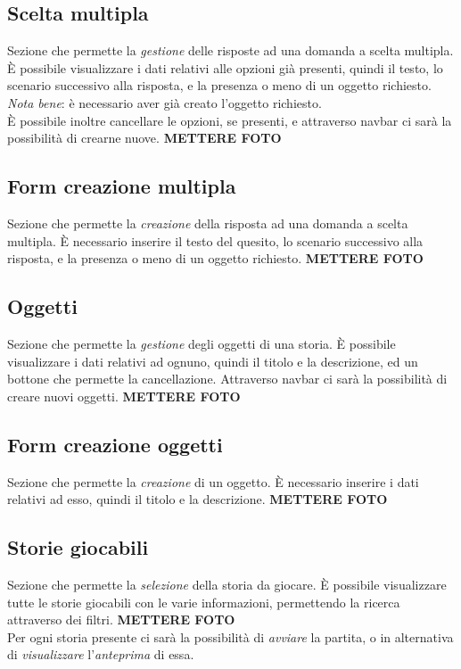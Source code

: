 \documentclass{article}
\begin{document}
\subsection*{Scelta multipla}
Sezione che permette la \textit{gestione} delle risposte ad una domanda a scelta multipla. È possibile visualizzare i dati relativi alle opzioni già presenti, quindi il testo, lo scenario successivo alla risposta, e la presenza o meno di un oggetto richiesto.\vspace*{7pt}\\
\textit{Nota bene}: è necessario aver già creato l'oggetto richiesto.\vspace*{7pt}\\
È possibile inoltre cancellare le opzioni, se presenti, e attraverso navbar ci sarà la possibilità di crearne nuove.
\textbf{METTERE FOTO}

\subsection*{Form creazione multipla}
Sezione che permette la \textit{creazione} della risposta ad una domanda a scelta multipla. È necessario inserire il testo del quesito, lo scenario successivo alla risposta, e la presenza o meno di un oggetto richiesto. 
\textbf{METTERE FOTO}

\subsection*{Oggetti}
Sezione che permette la \textit{gestione} degli oggetti di una storia. È possibile visualizzare i dati relativi ad ognuno, quindi il titolo e la descrizione, ed un bottone che permette la cancellazione. Attraverso navbar ci sarà la possibilità di creare nuovi oggetti.
\textbf{METTERE FOTO}

\subsection*{Form creazione oggetti}
Sezione che permette la \textit{creazione} di un oggetto. È necessario inserire i dati relativi ad esso, quindi il titolo e la descrizione.
\textbf{METTERE FOTO}

\subsection*{Storie giocabili}
Sezione che permette la \textit{selezione} della storia da giocare. È possibile visualizzare tutte le storie giocabili con le varie informazioni, permettendo la ricerca attraverso dei filtri. 
\textbf{METTERE FOTO}\vspace*{7pt}\\
Per ogni storia presente ci sarà la possibilità di \textit{avviare} la partita, o in alternativa di \textit{visualizzare} l'\textit{anteprima} di essa.
\end{document}
